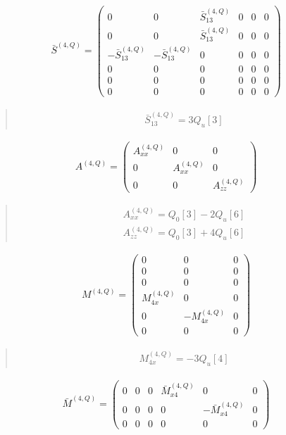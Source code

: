 \documentclass[fleqn,10pt]{jsarticle}
\begin{document}
\begin{align*}
\bar{S}^{(4,Q)} = \begin{pmatrix} 0 & 0 & \bar{S}^{(4,Q)}_{13} & 0 & 0 & 0 \\ 0 & 0 & \bar{S}^{(4,Q)}_{13} & 0 & 0 & 0 \\ - \bar{S}^{(4,Q)}_{13} & - \bar{S}^{(4,Q)}_{13} & 0 & 0 & 0 & 0 \\ 0 & 0 & 0 & 0 & 0 & 0 \\ 0 & 0 & 0 & 0 & 0 & 0 \\ 0 & 0 & 0 & 0 & 0 & 0 \end{pmatrix}
\end{align*}
\begin{quote}
\begin{align*}
& \bar{S}^{(4,Q)}_{13} = 3 Q_{u}[3]
\end{align*}
\end{quote}
\begin{align*}
A^{(4,Q)} = \begin{pmatrix} A^{(4,Q)}_{xx} & 0 & 0 \\ 0 & A^{(4,Q)}_{xx} & 0 \\ 0 & 0 & A^{(4,Q)}_{zz} \end{pmatrix}
\end{align*}
\begin{quote}
\begin{align*}
& A^{(4,Q)}_{xx} = Q_{0}[3] - 2 Q_{u}[6] \\
& A^{(4,Q)}_{zz} = Q_{0}[3] + 4 Q_{u}[6]
\end{align*}
\end{quote}
\begin{align*}
M^{(4,Q)} = \begin{pmatrix} 0 & 0 & 0 \\ 0 & 0 & 0 \\ 0 & 0 & 0 \\ M^{(4,Q)}_{4x} & 0 & 0 \\ 0 & - M^{(4,Q)}_{4x} & 0 \\ 0 & 0 & 0 \end{pmatrix}
\end{align*}
\begin{quote}
\begin{align*}
& M^{(4,Q)}_{4x} = - 3 Q_{u}[4]
\end{align*}
\end{quote}
\begin{align*}
\bar{M}^{(4,Q)} = \begin{pmatrix} 0 & 0 & 0 & \bar{M}^{(4,Q)}_{x4} & 0 & 0 \\ 0 & 0 & 0 & 0 & - \bar{M}^{(4,Q)}_{x4} & 0 \\ 0 & 0 & 0 & 0 & 0 & 0 \end{pmatrix}
\end{align*}
\end{document}
